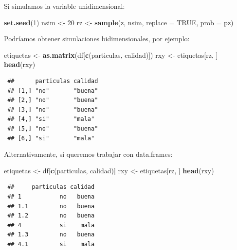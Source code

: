 \documentclass[
  spanish,
  10pt,
]{book}
\newenvironment{Shaded}{\begin{snugshade}}{\end{snugshade}}
\newcommand{\AttributeTok}[1]{\textcolor[rgb]{0.13,0.29,0.53}{#1}}
\newcommand{\ConstantTok}[1]{\textcolor[rgb]{0.56,0.35,0.01}{#1}}
\newcommand{\DecValTok}[1]{\textcolor[rgb]{0.00,0.00,0.81}{#1}}
\newcommand{\FunctionTok}[1]{\textcolor[rgb]{0.13,0.29,0.53}{\textbf{#1}}}
\newcommand{\NormalTok}[1]{#1}
\newcommand{\OtherTok}[1]{\textcolor[rgb]{0.56,0.35,0.01}{#1}}
\newcommand{\StringTok}[1]{\textcolor[rgb]{0.31,0.60,0.02}{#1}}
\theoremstyle{break}
\theoremstyle{nonumberplain}
\begin{document}
Si simulamos la variable unidimensional:

\begin{Shaded}
\begin{Highlighting}[]
\FunctionTok{set.seed}\NormalTok{(}\DecValTok{1}\NormalTok{)}
\NormalTok{nsim }\OtherTok{\textless{}{-}} \DecValTok{20}
\NormalTok{rz }\OtherTok{\textless{}{-}} \FunctionTok{sample}\NormalTok{(z, nsim, }\AttributeTok{replace =} \ConstantTok{TRUE}\NormalTok{, }\AttributeTok{prob =}\NormalTok{ pz)}
\end{Highlighting}
\end{Shaded}

Podríamos obtener simulaciones bidimensionales, por ejemplo:

\begin{Shaded}
\begin{Highlighting}[]
\NormalTok{etiquetas }\OtherTok{\textless{}{-}} \FunctionTok{as.matrix}\NormalTok{(df[}\FunctionTok{c}\NormalTok{(}\StringTok{\textquotesingle{}particulas\textquotesingle{}}\NormalTok{, }\StringTok{\textquotesingle{}calidad\textquotesingle{}}\NormalTok{)])}
\NormalTok{rxy }\OtherTok{\textless{}{-}}\NormalTok{ etiquetas[rz, ]}
\FunctionTok{head}\NormalTok{(rxy)}
\end{Highlighting}
\end{Shaded}

\begin{verbatim}
 ##      particulas calidad
 ## [1,] "no"       "buena"
 ## [2,] "no"       "buena"
 ## [3,] "no"       "buena"
 ## [4,] "si"       "mala" 
 ## [5,] "no"       "buena"
 ## [6,] "si"       "mala"
\end{verbatim}

Alternativamente, si queremos trabajar con data.frames:

\begin{Shaded}
\begin{Highlighting}[]
\NormalTok{etiquetas }\OtherTok{\textless{}{-}}\NormalTok{ df[}\FunctionTok{c}\NormalTok{(}\StringTok{\textquotesingle{}particulas\textquotesingle{}}\NormalTok{, }\StringTok{\textquotesingle{}calidad\textquotesingle{}}\NormalTok{)]}
\NormalTok{rxy }\OtherTok{\textless{}{-}}\NormalTok{ etiquetas[rz, ]}
\FunctionTok{head}\NormalTok{(rxy)}
\end{Highlighting}
\end{Shaded}

\begin{verbatim}
 ##     particulas calidad
 ## 1           no   buena
 ## 1.1         no   buena
 ## 1.2         no   buena
 ## 4           si    mala
 ## 1.3         no   buena
 ## 4.1         si    mala
\end{verbatim}
\end{document}
